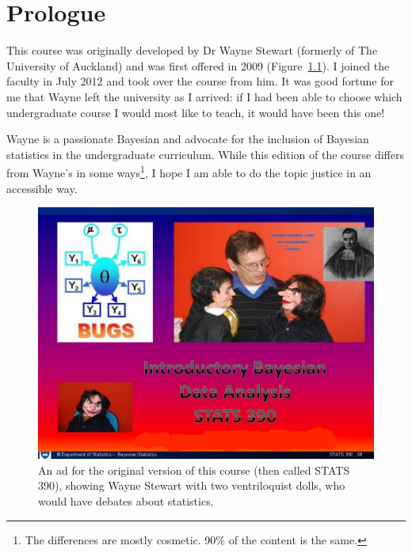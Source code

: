 \chapter{Prologue}
This course was originally developed by Dr Wayne Stewart (formerly of The
University of
Auckland) and was first offered in 2009 (Figure~\ref{fig:wayne}).
I joined the faculty in July 2012
and took over the course from him. It was good fortune for me that Wayne left
the university as I arrived: if I had been able to choose which undergraduate
course I would most like to teach, it would have been this one!

Wayne is a passionate Bayesian and advocate
for the inclusion of Bayesian statistics in the undergraduate curriculum.
While this edition of the course differs from Wayne's in some ways\footnote{
The differences are mostly cosmetic. 90\% of the content is the same.},
I hope I am able to do the topic justice in an accessible way.

\begin{figure}
\begin{center}
\includegraphics[scale=0.5]{Figures/390course.jpg}
\end{center}
\caption{An ad for the original version of this course (then called
STATS 390), showing Wayne Stewart with two ventriloquist dolls, who would
have debates about statistics.\label{fig:wayne}}
\end{figure}

